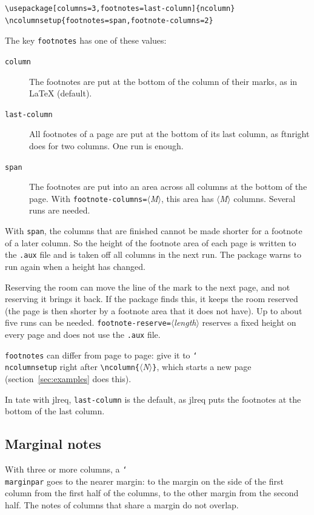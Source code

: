 \documentclass{article}
\newcommand*\cs[1]{\texttt{\char`\\#1}}
\newcommand*\pkg[1]{\textsf{#1}}
\newcommand*\key[1]{\texttt{#1}}
\newcommand*\meta[1]{$\langle$\textit{#1}$\rangle$}
\begin{document}
\begin{verbatim}
\usepackage[columns=3,footnotes=last-column]{ncolumn}
\ncolumnsetup{footnotes=span,footnote-columns=2}
\end{verbatim}
The key \key{footnotes} has one of these values:
\begin{description}
\item[\key{column}] The footnotes are put at the bottom of the column
  of their marks, as in \LaTeX{} (default).
\item[\key{last-column}] All footnotes of a page are put at the bottom
  of its last column, as \pkg{ftnright} does for two columns.  One run
  is enough.
\item[\key{span}] The footnotes are put into an area across all
  columns at the bottom of the page.  With
  \key{footnote-columns=}\meta{M}, this area has \meta{M} columns.
  Several runs are needed.
\end{description}
With \key{span}, the columns that are finished cannot be made shorter
for a footnote of a later column.  So the height of the footnote area
of each page is written to the \texttt{.aux} file and is taken off all
columns in the next run.  The package warns to run again when a height
has changed.

Reserving the room can move the line of the mark to the next page, and
not reserving it brings it back.  If the package finds this, it keeps
the room reserved (the page is then shorter by a footnote area that it
does not have).  Up to about five runs can be needed.
\key{footnote-reserve=}\meta{length} reserves a fixed height on every
page and does not use the \texttt{.aux} file.

\key{footnotes} can differ from page to page: give it to
\cs{ncolumnsetup} right after \verb|\ncolumn{|\meta{N}\verb|}|, which
starts a new page (section~\ref{sec:examples} does this).

In tate with \pkg{jlreq}, \key{last-column} is the default, as
\pkg{jlreq} puts the footnotes at the bottom of the last column.

\subsection{Marginal notes}

With three or more columns, a \cs{marginpar} goes to the nearer
margin: to the margin on the side of the first column from the first
half of the columns, to the other margin from the second half.  The
notes of columns that share a margin do not overlap.
\end{document}
